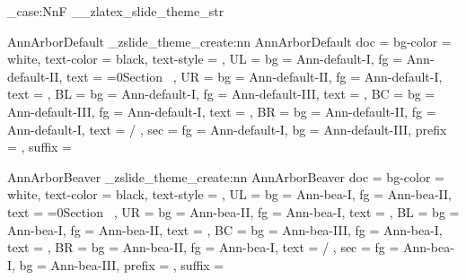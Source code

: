\str_case:NnF \g__zlatex_slide_theme_str {
  {AnnArborDefault}{
    \_zslide_theme_create:nn {AnnArborDefault}{
      doc = {
        bg-color = white,
        text-color = black,
        text-style = \sfdefault
      },
      UL = {
        bg   = Ann-default-I,
        fg   = Ann-default-II,
        text = {\ifnum{}=0\else Section\ \thesection\fi}
      },
      UR = {
        bg   = Ann-default-II,
        fg   = Ann-default-I,
        text = {\zslideDefaultUR}
      },
      BL = {
        bg   = Ann-default-I,
        fg   = Ann-default-III,
        text = \zslideAuthor
      },
      BC = {
        bg   = Ann-default-III,
        fg   = Ann-default-I,
        text = \zslideTitle
      },
      BR = {
        bg   = Ann-default-II,
        fg   = Ann-default-I,
        text = \zslideDate\quad \thepage/\pageref{zslide-last-page}
      },
      sec = {
        fg   = Ann-default-I,
        bg   = Ann-default-III,
        prefix = {},
        suffix = {}
      }
    }
  }

  {AnnArborBeaver}{
    \_zslide_theme_create:nn {AnnArborBeaver}{ 
      doc = {
        bg-color = white,
        text-color = black,
        text-style = \sfdefault
      },
      UL = {
        bg   = Ann-bea-I,
        fg   = Ann-bea-II, 
        text = {\ifnum{}=0\else Section\ \thesection\fi} 
      },
      UR = {
        bg   = Ann-bea-II,
        fg   = Ann-bea-I,
        text = {\zslideDefaultUR}
      },
      BL = {
        bg   = Ann-bea-I,
        fg   = Ann-bea-II,
        text = \zslideAuthor
      },
      BC = {
        bg   = Ann-bea-III,
        fg   = Ann-bea-I,
        text = \zslideTitle
      },
      BR = {
        bg   = Ann-bea-II,
        fg   = Ann-bea-I,
        text = \zslideDate\quad \thepage/\pageref{zslide-last-page} 
      },
      sec = {
        fg   = Ann-bea-I,
        bg   = Ann-bea-III,
        prefix = {},
        suffix = {}
      }
    }
  }

}
